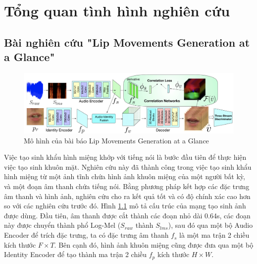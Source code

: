 \chapter{Tổng quan tình hình nghiên cứu}

\section{Bài nghiên cứu "Lip Movements Generation at a Glance"\cite{chen2018}}

\begin{figure}[H]
    \centering
    \includegraphics[width=15cm]{./content/images/chen2018_model.png}
    \caption{Mô hình của bài báo Lip Movements Generation at a Glance}
    \label{fig:chen2018_model}
\end{figure}

Việc tạo sinh khẩu hình miệng khớp với tiếng nói là bước đầu tiên để thực hiện việc tạo sinh khuôn mặt. Nghiên cứu này đã thành công trong việc tạo sinh khẩu hình miệng từ một ảnh tĩnh chứa hình ảnh khuôn miệng của một người bất kỳ, và một đoạn âm thanh chứa tiếng nói. Bằng phương pháp kết hợp các đặc trưng âm thanh và hình ảnh, nghiên cứu cho ra kết quả tốt và có độ chính xác cao hơn so với các nghiên cứu trước đó. Hình \ref{fig:chen2018_model} mô tả cấu trúc của mạng tạo sinh ảnh được dùng. Đầu tiên, âm thanh được cắt thành các đoạn nhỏ dài 0.64s, các đoạn này được chuyển thành phổ Log-Mel ($S_{raw}$ thành $S_{lms}$), sau đó qua một bộ Audio Encoder để trích đặc trưng, ta có đặc trưng âm thanh $f_s$ là một ma trận 2 chiều kích thước $F \times T$. Bên cạnh đó, hình ảnh khuôn miệng cũng được đưa qua một bộ Identity Encoder để tạo thành ma trận 2 chiều $f_p$ kích thước $H \times W$.

